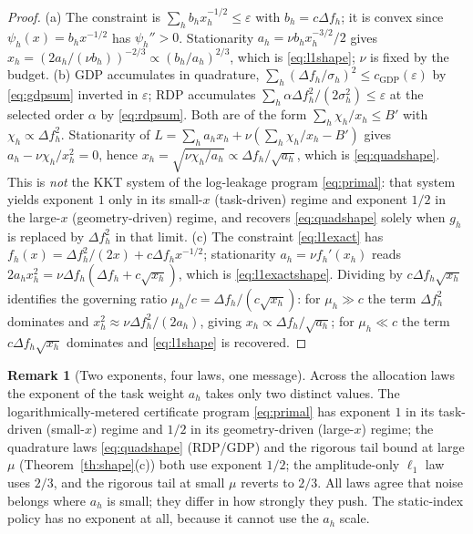 \documentclass{ieeetj}
\theoremstyle{plain}
\theoremstyle{definition}
\newtheorem{remark}{Remark}
\begin{document}
\begin{proof}
(a) The constraint is $\sum_hb_hx_h^{-1/2}\le\varepsilon$ with
$b_h=c\Delta f_h$; it is convex since $\psi_h(x)=b_hx^{-1/2}$ has
$\psi_h''>0$. Stationarity $a_h=\nu b_hx_h^{-3/2}/2$ gives
$x_h=(2a_h/(\nu b_h))^{-2/3}\propto(b_h/a_h)^{2/3}$, which is
\eqref{eq:l1shape}; $\nu$ is fixed by the budget.
(b) GDP accumulates in quadrature,
$\sum_h(\Delta f_h/\sigma_h)^{2}\le c_{\mathrm{GDP}}(\varepsilon)$ by
\eqref{eq:gdpsum} inverted in $\varepsilon$; RDP accumulates
$\sum_h\alpha\Delta f_h^2/(2\sigma_h^2)\le\varepsilon$ at the selected order
$\alpha$ by \eqref{eq:rdpsum}. Both are of the form $\sum_h\chi_h/x_h\le B'$
with $\chi_h\propto\Delta f_h^2$. Stationarity of
$L=\sum_ha_hx_h+\nu(\sum_h\chi_h/x_h-B')$ gives
$a_h-\nu\chi_h/x_h^2=0$, hence $x_h=\sqrt{\nu\chi_h/a_h}\propto\Delta f_h/\sqrt{a_h}$,
which is \eqref{eq:quadshape}. This is \emph{not} the KKT system of the log-leakage
program \eqref{eq:primal}: that system yields exponent $1$ only in its small-$x$
(task-driven) regime and exponent $1/2$ in the large-$x$ (geometry-driven)
regime, and recovers \eqref{eq:quadshape} solely when $g_h$ is replaced by
$\Delta f_h^2$ in that limit.
(c) The constraint \eqref{eq:l1exact} has
$f_h(x)=\Delta f_h^2/(2x)+c\Delta f_hx^{-1/2}$; stationarity
$a_h=\nu f_h'(x_h)$ reads
$2a_hx_h^2=\nu\Delta f_h(\Delta f_h+c\sqrt{x_h})$, which is
\eqref{eq:l1exactshape}. Dividing by $c\Delta f_h\sqrt{x_h}$ identifies the
governing ratio $\mu_h/c=\Delta f_h/(c\sqrt{x_h})$: for $\mu_h\gg c$ the term
$\Delta f_h^2$ dominates and $x_h^2\approx\nu\Delta f_h^2/(2a_h)$, giving
$x_h\propto\Delta f_h/\sqrt{a_h}$; for $\mu_h\ll c$ the term
$c\Delta f_h\sqrt{x_h}$ dominates and \eqref{eq:l1shape} is recovered.
\end{proof}

\begin{remark}[Two exponents, four laws, one message]
\label{rm:exponents}
Across the allocation laws the exponent of the task weight $a_h$ takes only two
distinct values. The logarithmically-metered certificate program
\eqref{eq:primal} has exponent $1$ in its task-driven (small-$x$) regime and
$1/2$ in its geometry-driven (large-$x$) regime; the quadrature laws
\eqref{eq:quadshape} (RDP/GDP) and the rigorous tail bound at large $\mu$
(Theorem~\ref{th:shape}(c)) both use exponent $1/2$; the amplitude-only
$\ell_1$ law uses $2/3$, and the rigorous tail at small $\mu$ reverts to $2/3$.
All laws agree that noise belongs where $a_h$ is small; they differ in how
strongly they push. The static-index policy has no exponent at all, because it
cannot use the $a_h$ scale.
\end{remark}
\end{document}
